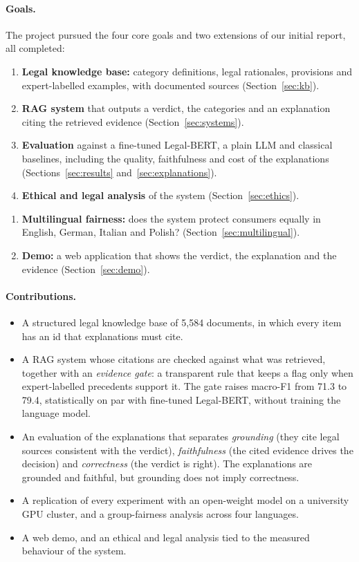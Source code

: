 \paragraph{Goals.} The project pursued the four core goals and two extensions of our initial report, all completed:
\begin{enumerate}[label=\textbf{G\arabic*.}]
  \item \textbf{Legal knowledge base:} category definitions, legal rationales, provisions and expert-labelled examples, with documented sources (Section~\ref{sec:kb}).
  \item \textbf{RAG system} that outputs a verdict, the categories and an explanation citing the retrieved evidence (Section~\ref{sec:systems}).
  \item \textbf{Evaluation} against a fine-tuned Legal-BERT, a plain LLM and classical baselines, including the quality, faithfulness and cost of the explanations (Sections~\ref{sec:results} and~\ref{sec:explanations}).
  \item \textbf{Ethical and legal analysis} of the system (Section~\ref{sec:ethics}).
\end{enumerate}
\begin{enumerate}[label=\textbf{E\arabic*.}]
  \item \textbf{Multilingual fairness:} does the system protect consumers equally in English, German, Italian and Polish? (Section~\ref{sec:multilingual}).
  \item \textbf{Demo:} a web application that shows the verdict, the explanation and the evidence (Section~\ref{sec:demo}).
\end{enumerate}

\paragraph{Contributions.}
\begin{itemize}
  \item A structured legal knowledge base of 5,584 documents, in which every item has an id that explanations must cite.
  \item A RAG system whose citations are checked against what was retrieved, together with an \emph{evidence gate}: a transparent rule that keeps a flag only when expert-labelled precedents support it. The gate raises macro-F1 from 71.3 to 79.4, statistically on par with fine-tuned Legal-BERT, without training the language model.
  \item An evaluation of the explanations that separates \emph{grounding} (they cite legal sources consistent with the verdict), \emph{faithfulness} (the cited evidence drives the decision) and \emph{correctness} (the verdict is right). The explanations are grounded and faithful, but grounding does not imply correctness.
  \item A replication of every experiment with an open-weight model on a university GPU cluster, and a group-fairness analysis across four languages.
  \item A web demo, and an ethical and legal analysis tied to the measured behaviour of the system.
\end{itemize}

